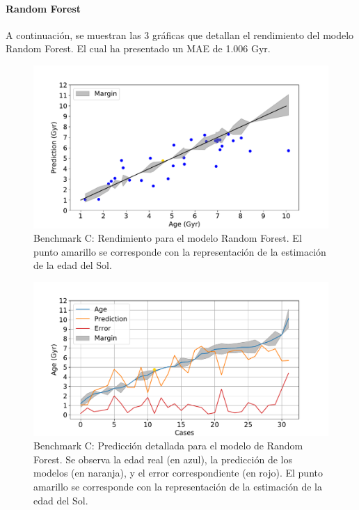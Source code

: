\paragraph{Random Forest} 
A continuación, se muestran las 3 gráficas que detallan el rendimiento del modelo Random Forest. El cual ha presentado un MAE de 1.006 Gyr.

\begin{figure}[H]
\begin{center}
 \includegraphics[width=0.8\linewidth]{Figuras/Experimentos/B_C_rf_1.pdf}
\end{center}
\caption{Benchmark C: Rendimiento para el modelo Random Forest. El punto amarillo se corresponde con la representación de la estimación de la edad del Sol.}
 \label{fig:benchC_details_rf_1}
\end{figure}

\begin{figure}[H]
\begin{center}
 \includegraphics[width=0.8\linewidth]{Figuras/Experimentos/B_C_rf_2.pdf}
\end{center}
\caption{Benchmark C: Predicción detallada para el modelo de Random Forest. Se observa la edad real (en azul), la predicción de los modelos (en naranja), y el error correspondiente (en rojo). El punto amarillo se corresponde con la representación de la estimación de la edad del Sol.}
 \label{fig:benchC_details_rf_2}
\end{figure}

